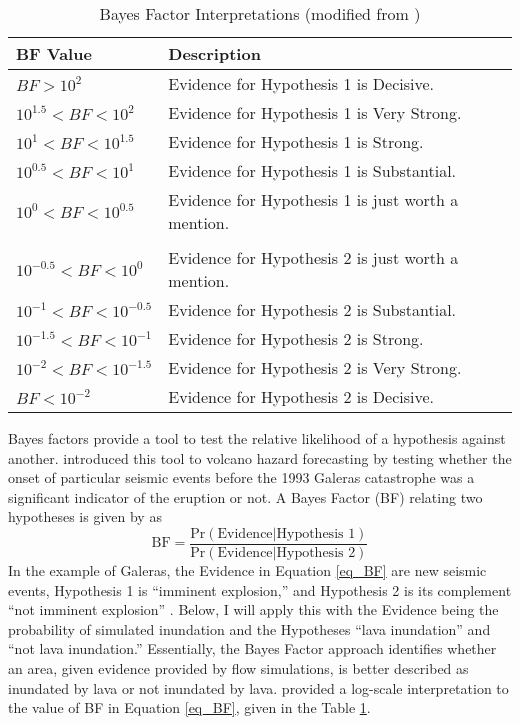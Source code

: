 	\begin{table}[h]
		\centering
		\caption{Bayes Factor Interpretations (modified from \citet{aspinall2003evidence})}
		\begin{tabular}{l l}
			\toprule
			BF Value & Description\\
			\midrule
			$BF>10^2$ & Evidence for Hypothesis 1 is Decisive.\\
			$10^{1.5}<BF<10^2$ & Evidence for Hypothesis 1 is Very Strong.\\
			$10^{1}<BF<10^{1.5}$ & Evidence for Hypothesis 1 is Strong.\\
			$10^{0.5}<BF<10^{1}$ & Evidence for Hypothesis 1 is Substantial.\\
			$10^{0}<BF<10^{0.5}$ & Evidence for Hypothesis 1 is just worth a mention.\\\\
			$10^{-0.5}<BF<10^{0}$ & Evidence for Hypothesis 2 is just worth a mention.\\
			$10^{-1}<BF<10^{-0.5}$ & Evidence for Hypothesis 2 is Substantial.\\
			$10^{-1.5}<BF<10^{-1}$ & Evidence for Hypothesis 2 is Strong.\\
			$10^{-2}<BF<10^{-1.5}$ & Evidence for Hypothesis 2 is Very Strong.\\
			$BF<10^{-2}$ & Evidence for Hypothesis 2 is Decisive.\\
			\bottomrule
		\end{tabular}
		\label{tab_BFinterps}
	\end{table}
	
	Bayes factors provide a tool to test the relative likelihood of a hypothesis against another. \citet{aspinall2003evidence} introduced this tool to volcano hazard forecasting by testing whether the onset of particular seismic events before the 1993 Galeras catastrophe was a significant indicator of the eruption or not. A Bayes Factor (BF) relating two hypotheses is given by \citet{jeffreys1998theory} as
	\begin{equation}
		\text{BF} = \frac{\text{Pr}(\text{Evidence}|\text{Hypothesis~1})}{\text{Pr}(\text{Evidence}|\text{Hypothesis~2})}
		\label{eq_BF}
	\end{equation}
	In the example of Galeras, the Evidence in Equation \ref{eq_BF} are new seismic events, Hypothesis 1 is ``imminent explosion,'' and Hypothesis 2 is its complement ``not imminent explosion'' \citep{aspinall2003evidence}. Below, I will apply this with the Evidence being the probability of simulated inundation and the Hypotheses ``lava inundation'' and ``not lava inundation.'' Essentially, the Bayes Factor approach identifies whether an area, given evidence provided by flow simulations, is better described as inundated by lava or not inundated by lava. \citet{jeffreys1998theory} provided a log-scale interpretation to the value of BF in Equation \ref{eq_BF}, given in the Table \ref{tab_BFinterps}.
	
